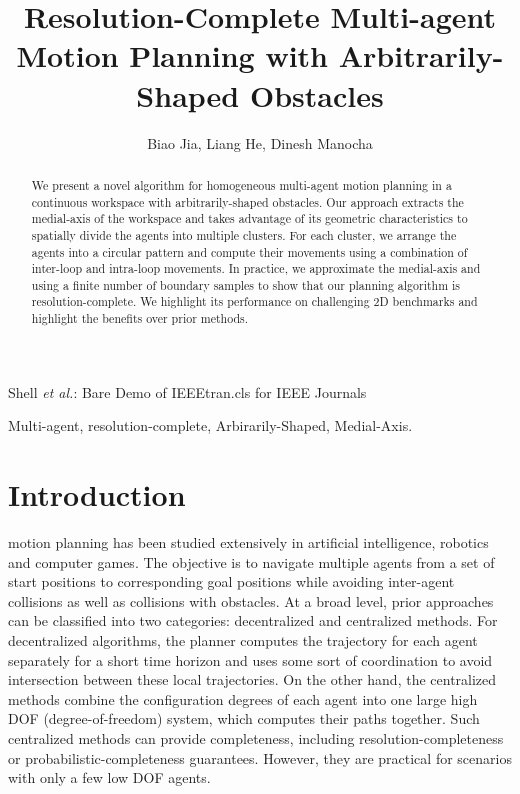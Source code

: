 \documentclass[journal]{IEEEtran}
\begin{document}
\title{Resolution-Complete Multi-agent Motion Planning with Arbitrarily-Shaped Obstacles}

\author{Biao Jia, Liang He, Dinesh Manocha}%


%
{Shell \MakeLowercase{\textit{et al.}}: Bare Demo of IEEEtran.cls for IEEE Journals}


\maketitle

\begin{abstract}
We present a novel algorithm for homogeneous multi-agent motion planning in a continuous workspace with arbitrarily-shaped obstacles. Our approach  extracts the medial-axis of the workspace and takes advantage of its geometric characteristics to spatially divide the agents into multiple clusters. For each cluster, we arrange the  agents into a circular pattern and compute their movements using a combination of inter-loop and intra-loop movements. In practice, we approximate the medial-axis and using a finite number of boundary samples to show that our planning algorithm is resolution-complete. We highlight its performance on challenging 2D benchmarks and highlight the benefits over prior methods.
\end{abstract}

\begin{IEEEkeywords}
Multi-agent, resolution-complete, Arbirarily-Shaped, Medial-Axis.
\end{IEEEkeywords}

\IEEEpeerreviewmaketitle

\section{Introduction}
 motion planning has been studied extensively in artificial intelligence, robotics and computer games.
The objective is to navigate multiple agents from a set of start positions to corresponding goal positions while avoiding inter-agent collisions as well as collisions with obstacles.
At a broad level, prior approaches can be classified into two categories: decentralized and centralized methods. 
For decentralized algorithms, the planner computes the trajectory for each agent separately for a short time horizon and uses some sort of coordination to avoid intersection between these local trajectories. On the other hand, the centralized methods combine the configuration degrees of each agent into one large high DOF (degree-of-freedom) system, which computes their paths together. Such centralized methods can provide completeness, including resolution-completeness or probabilistic-completeness guarantees. However, they are practical for scenarios with only a few low DOF agents.
\end{document}
